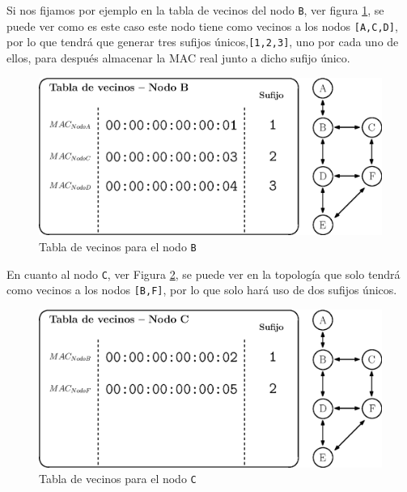 Si nos fijamos por ejemplo en la tabla de vecinos del nodo \texttt{B}, ver figura \ref{fig:topo_hello_nodoB_nb}, se puede ver como es este caso este nodo tiene como vecinos a los nodos \texttt{[A,C,D]}, por lo que tendrá que generar tres sufijos únicos,\texttt{[1,2,3]}, uno por cada uno de ellos, para después almacenar la MAC real junto a dicho sufijo único.\\

\begin{figure}[ht!]
    \centering
    \includegraphics[width=\textwidth]{archivos/img/dev/topo_hello_nodoB_nb.eps}
    \caption{Tabla de vecinos para el nodo \texttt{B}}
    \label{fig:topo_hello_nodoB_nb}
\end{figure}

En cuanto al nodo \texttt{C}, ver Figura \ref{fig:topo_hello_nodoC_nb}, se puede ver en la topología que solo tendrá como vecinos a los nodos \texttt{[B,F]}, por lo que solo hará uso de dos sufijos únicos.\\

\begin{figure}[ht!]
    \centering
    \includegraphics[width=\textwidth]{archivos/img/dev/topo_hello_nodoC_nb.eps}
    \caption{Tabla de vecinos para el nodo \texttt{C}}
    \label{fig:topo_hello_nodoC_nb}
\end{figure}

